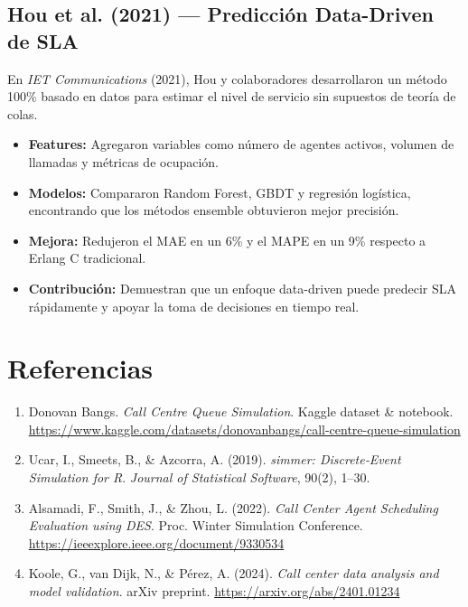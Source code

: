 \documentclass[12pt]{article}
\begin{document}
\subsection{Hou et al. (2021) — Predicción Data-Driven de SLA}
En \emph{IET Communications} (2021), Hou y colaboradores desarrollaron un método 100\% basado en datos para estimar el nivel de servicio sin supuestos de teoría de colas.  
\begin{itemize}
  \item \textbf{Features:} Agregaron variables como número de agentes activos, volumen de llamadas y métricas de ocupación.  
  \item \textbf{Modelos:} Compararon Random Forest, GBDT y regresión logística, encontrando que los métodos ensemble obtuvieron mejor precisión.  
  \item \textbf{Mejora:} Redujeron el MAE en un 6\% y el MAPE en un 9\% respecto a Erlang C tradicional.  
  \item \textbf{Contribución:} Demuestran que un enfoque data-driven puede predecir SLA rápidamente y apoyar la toma de decisiones en tiempo real.
\end{itemize}

\newpage
\section*{Referencias}
\begin{enumerate}
  \item Donovan Bangs. \emph{Call Centre Queue Simulation}. Kaggle dataset \& notebook.  
    \url{https://www.kaggle.com/datasets/donovanbangs/call-centre-queue-simulation}
  \item Ucar, I., Smeets, B., \& Azcorra, A. (2019). \emph{simmer: Discrete‐Event Simulation for R}.  
    \textit{Journal of Statistical Software}, 90(2), 1–30.
  \item Alsamadi, F., Smith, J., \& Zhou, L. (2022). \emph{Call Center Agent Scheduling Evaluation using DES}.  
    Proc. Winter Simulation Conference.  
    \url{https://ieeexplore.ieee.org/document/9330534}
  \item Koole, G., van Dijk, N., \& Pérez, A. (2024). \emph{Call center data analysis and model validation}.  
    arXiv preprint.  
    \url{https://arxiv.org/abs/2401.01234}
  
\end{enumerate}
\end{document}
